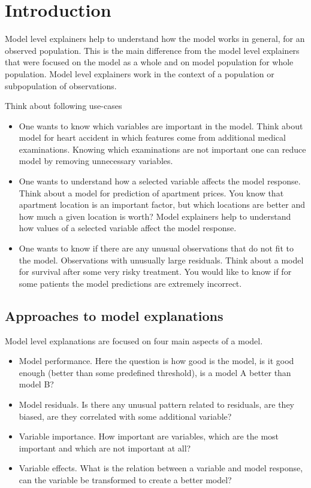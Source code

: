 \documentclass[]{krantz}
\providecommand{\tightlist}{%
  \setlength{\itemsep}{0pt}\setlength{\parskip}{0pt}}
\theoremstyle{definition}
\theoremstyle{definition}
\theoremstyle{definition}
\theoremstyle{remark}
\begin{document}
\hypertarget{introduction-2}{%
\section{Introduction}\label{introduction-2}}

Model level explainers help to understand how the model works in
general, for an observed population. This is the main difference from
the model level explainers that were focused on the model as a whole and
on model population for whole population. Model level explainers work in
the context of a population or subpopulation of observations.

Think about following use-cases

\begin{itemize}
\tightlist
\item
  One wants to know which variables are important in the model. Think
  about model for heart accident in which features come from additional
  medical examinations. Knowing which examinations are not important one
  can reduce model by removing unnecessary variables.
\item
  One wants to understand how a selected variable affects the model
  response. Think about a model for prediction of apartment prices. You
  know that apartment location is an important factor, but which
  locations are better and how much a given location is worth? Model
  explainers help to understand how values of a selected variable affect
  the model response.
\item
  One wants to know if there are any unusual observations that do not
  fit to the model. Observations with unusually large residuals. Think
  about a model for survival after some very risky treatment. You would
  like to know if for some patients the model predictions are extremely
  incorrect.
\end{itemize}

\hypertarget{approaches-to-model-explanations}{%
\subsection{Approaches to model
explanations}\label{approaches-to-model-explanations}}

Model level explanations are focused on four main aspects of a model.

\begin{itemize}
\tightlist
\item
  Model performance. Here the question is how good is the model, is it
  good enough (better than some predefined threshold), is a model A
  better than model B?
\item
  Model residuals. Is there any unusual pattern related to residuals,
  are they biased, are they correlated with some additional variable?
\item
  Variable importance. How important are variables, which are the most
  important and which are not important at all?
\item
  Variable effects. What is the relation between a variable and model
  response, can the variable be transformed to create a better model?
\end{itemize}
\end{document}
